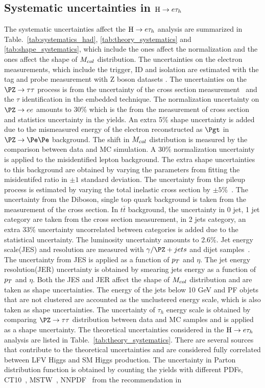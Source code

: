 \subsection{Systematic uncertainties in $\mathrm{H} \to e \tau_{h}$}

The systematic uncertainties affect the $\mathrm{H} \to e \tau_{h}$ analysis are summarized in Table.~\ref{tab:systematics_had}, \ref{tab:theory_systematics} and \ref{tab:shape_systematics}, which include the ones affect the normalization and the ones affect the shape of $M_{col}$ distribution. The uncertainties on the electron measurements, which include the trigger, ID and isolation are estimated with the tag and probe measurement with Z boson datasets \cite{CMS:2011aa,Khachatryan:2015dfa}. The uncertainties on the $\PZ \to \tau \tau$ process is from the uncertainty of the cross section measurement~\cite{Chatrchyan:2014mua} and the $\tau$ identification in the embedded technique. The normalization uncertainty on $\PZ \to ee$ amounts to 30\% which is the from the measurement of cross section and statistics uncertainty in the yields. An extra 5\% shape uncertainty is added due to the mismeasured energy of the electron reconstructed as $\Pgt$ in $\PZ \to \Pe\Pe$ background.  The shift in $M_{col}$ distribution is measured by the comparison between data and MC simulation. A 30\% normalization uncertainty is applied to the misidentified lepton background. The extra shape uncertainties to this background are obtained by varying the parameters from fitting the misidentifed ratio in $\pm1$ standard deviation.   The uncertainty from the pileup process is estimated by varying the total inelastic cross section by $\pm5\%$~\cite{Chatrchyan:2012nj}. The uncertainty from the Diboson, single top quark background is taken from the measurement of the cross section. In $t\bar{t}$ background, the uncertainty in 0 jet, 1 jet category are taken from the cross section measurement, in 2  jets category, an extra 33\% uncertainty uncorrelated between categories is added due to the statistical uncertainty. The luminosity uncertainty amounts to 2.6\%.  Jet energy scale(JES) and resolution are measured with $\gamma/\PZ+jets$ and dijet samples~\cite{CMS-JME-10-011}. The uncertainty from JES is applied as a function of $p_{T}$ and $\eta$. The jet energy resolution(JER) uncertainty is obtained by smearing jets energy as a function of $p_{T}$ and $\eta$. Both the JES and JER affect the shape of $M_{col}$ distribution and are taken as shape uncertainties. The energy of the jets below 10 GeV and PF objets that are not clustered are accounted as the unclustered energy scale, which is also taken as shape uncertainties. The uncertainty of $\tau_{h}$ energy scale is obtained by comparing $\PZ \to \tau\tau$ distribution between data and MC samples and is applied as a shape uncertainty. The theoretical uncertainties considered in the $\mathrm{H} \to e \tau_{h}$ analysis are listed in Table.~\ref{tab:theory_systematics}. There are several sources that contribute to the theoretical uncertainties and are considered fully correlated between LFV Higgs and SM Higgs production. The uncertainty in Parton distribution function is obtained by counting the yields with different PDFs,  CT10~\cite{Nadolsky:2008zw}, MSTW~\cite{Martin:2009iq}, NNPDF~\cite{Ball:2010de}  from the recommendation in 